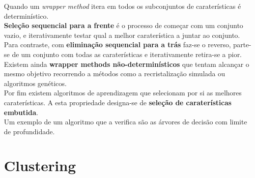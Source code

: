 \documentclass[]{report}
\begin{document}
Quando um \textit{wrapper method} itera em todos os subconjuntos de caraterísticas é determinístico.\\
\textbf{Seleção sequencial para a frente} é o processo de começar com um conjunto vazio, e iterativamente testar qual a melhor caraterística a juntar ao conjunto.\\
Para contraste, com \textbf{eliminação sequencial para a trás} faz-se o reverso, parte-se de um conjunto com todas as caraterísticas  e iterativamente retira-se a pior.\\[2mm]
Existem ainda \textbf{wrapper methods não-determinísticos} que tentam alcançar o mesmo objetivo recorrendo a métodos como a recristalização simulada ou algoritmos genéticos.\\[2mm]
Por fim existem algoritmos de aprendizagem que selecionam por si as melhores caraterísticas. A esta propriedade designa-se de \textbf{seleção de caraterísticas embutida}.\\
Um exemplo de um algoritmo que a verifica são as árvores de decisão com limite de profundidade.
\chapter{Clustering}
\end{document}
